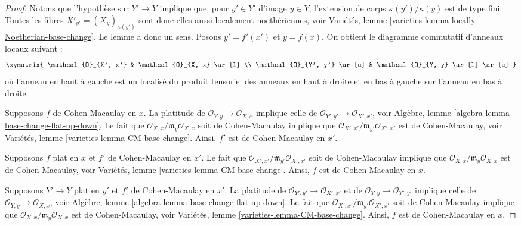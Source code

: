 \begin{proof}
Notons que l'hypothèse sur $Y' \to Y$ implique que, pour $y' \in Y'$
d'image $y \in Y$, l'extension de corps $\kappa(y')/\kappa(y)$
est de type fini. Toutes les fibres
$X'_{y'} = (X_y)_{\kappa(y')}$ sont donc elles aussi localement noethériennes, voir
Variétés, lemme \ref{varieties-lemma-locally-Noetherian-base-change}.
Le lemme a donc un sens. Posons $y' = f'(x')$ et $y = f(x)$.
On obtient le diagramme commutatif d'anneaux locaux suivant :
$$
\xymatrix{
\mathcal{O}_{X', x'} & \mathcal{O}_{X, x} \ar[l] \\
\mathcal{O}_{Y', y'} \ar[u] & \mathcal{O}_{Y, y} \ar[l] \ar[u]
}
$$
où l'anneau en haut à gauche est un localisé du produit tensoriel des anneaux
en haut à droite et en bas à gauche sur l'anneau en bas à droite.

\medskip\noindent
Supposons $f$ de Cohen-Macaulay en $x$.
La platitude de $\mathcal{O}_{Y, y} \to \mathcal{O}_{X, x}$
implique celle de $\mathcal{O}_{Y', y'} \to \mathcal{O}_{X', x'}$, voir
Algèbre, lemme \ref{algebra-lemma-base-change-flat-up-down}.
Le fait que $\mathcal{O}_{X, x}/\mathfrak m_y\mathcal{O}_{X, x}$
soit de Cohen-Macaulay implique que
$\mathcal{O}_{X', x'}/\mathfrak m_{y'}\mathcal{O}_{X', x'}$
est de Cohen-Macaulay, voir
Variétés, lemme \ref{varieties-lemma-CM-base-change}. Ainsi, $f'$
est de Cohen-Macaulay en $x'$.

\medskip\noindent
Supposons $f$ plat en $x$ et $f'$ de Cohen-Macaulay en $x'$.
Le fait que $\mathcal{O}_{X', x'}/\mathfrak m_{y'}\mathcal{O}_{X', x'}$
soit de Cohen-Macaulay implique que
$\mathcal{O}_{X, x}/\mathfrak m_y\mathcal{O}_{X, x}$
est de Cohen-Macaulay, voir
Variétés, lemme \ref{varieties-lemma-CM-base-change}.
Ainsi, $f$ est de Cohen-Macaulay en $x$.

\medskip\noindent
Supposons $Y' \to Y$ plat en $y'$ et $f'$ de Cohen-Macaulay en
$x'$. La platitude de $\mathcal{O}_{Y', y'} \to \mathcal{O}_{X', x'}$
et de $\mathcal{O}_{Y, y} \to \mathcal{O}_{Y', y'}$ implique celle
de $\mathcal{O}_{Y, y} \to \mathcal{O}_{X, x}$, voir
Algèbre, lemme \ref{algebra-lemma-base-change-flat-up-down}.
Le fait que $\mathcal{O}_{X', x'}/\mathfrak m_{y'}\mathcal{O}_{X', x'}$
soit de Cohen-Macaulay implique que
$\mathcal{O}_{X, x}/\mathfrak m_y\mathcal{O}_{X, x}$
est de Cohen-Macaulay, voir
Variétés, lemme \ref{varieties-lemma-CM-base-change}. Ainsi, $f$
est de Cohen-Macaulay en $x$.
\end{proof}


